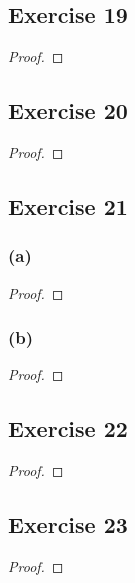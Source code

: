 \documentclass[14pt]{extarticle}
\begin{document}
\subsection{Exercise 19}

\begin{proof}

\end{proof}

\subsection{Exercise 20}

\begin{proof}

\end{proof}

\subsection{Exercise 21}

\subsubsection{(a)}

\begin{proof}

\end{proof}

\subsubsection{(b)}

\begin{proof}

\end{proof}

\subsection{Exercise 22}

\begin{proof}

\end{proof}

\subsection{Exercise 23}

\begin{proof}

\end{proof}
\end{document}
